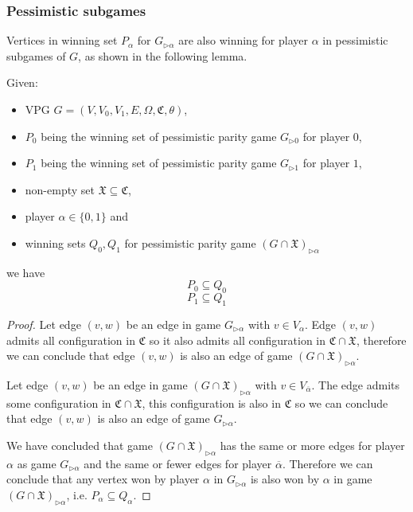 \subsubsection{Pessimistic subgames}
Vertices in winning set $P_\alpha$ for $G_{\triangleright\alpha}$ are also winning for player $\alpha$ in pessimistic subgames of $G$, as shown in the following lemma.
\begin{lemma}
	\label{lem_pessimistic_subgames}
	Given:
	\begin{itemize}
		\item VPG $G = (V,V_0,V_1,E,\Omega, \mathfrak{C},\theta)$,
		\item $P_0$ being the winning set of pessimistic parity game $G_{\triangleright0}$ for player $0$,
		\item $P_1$ being the winning set of pessimistic parity game $G_{\triangleright1}$ for player $1$,
		\item non-empty set $\mathfrak{X} \subseteq \mathfrak{C}$,
		\item player $\alpha \in \{0,1\}$ and
		\item winning sets $Q_0,Q_1$ for pessimistic parity game $(G \cap \mathfrak{X})_{\triangleright\alpha}$
	\end{itemize}
	we have
	\[ P_0 \subseteq Q_0 \]
	\[ P_1 \subseteq Q_1 \]
	\begin{proof}
		
		Let edge $(v,w)$ be an edge in game $G_{\triangleright\alpha}$ with $v \in V_\alpha$. Edge $(v,w)$ admits all configuration in $\mathfrak{C}$ so it also admits all configuration in $\mathfrak{C} \cap \mathfrak{X}$, therefore we can conclude that edge $(v,w)$ is also an edge of game $(G\cap \mathfrak{X})_{\triangleright\alpha}$.
		
		Let edge $(v,w)$ be an edge in game $(G \cap \mathfrak{X})_{\triangleright\alpha}$ with $v \in V_{\overline{\alpha}}$. The edge admits some configuration in $\mathfrak{C} \cap \mathfrak{X}$, this configuration is also in $\mathfrak{C}$ so we can conclude that edge $(v,w)$ is also an edge of game $G_{\triangleright\alpha}$.
		
		We have concluded that game $(G \cap \mathfrak{X})_{\triangleright\alpha}$ has the same or more edges for player $\alpha$ as game $G_{\triangleright\alpha}$ and the same or fewer edges for player $\overline{\alpha}$. Therefore we can conclude that any vertex won by player $\alpha$ in $G_{\triangleright\alpha}$ is also won by $\alpha$ in game $(G \cap \mathfrak{X})_{\triangleright\alpha}$, i.e. $P_\alpha \subseteq Q_\alpha$.
		

\end{proof}
\end{lemma}
